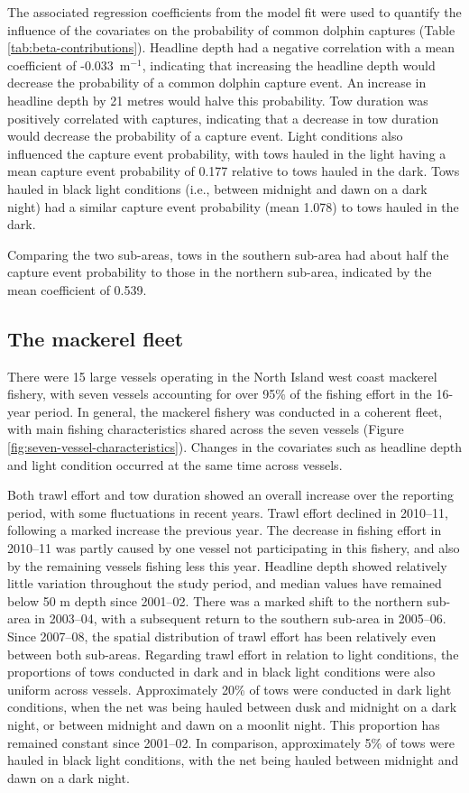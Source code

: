\documentclass[10pt]{article}
\begin{document}
The associated regression coefficients from the model fit were used to quantify the influence of the covariates on the probability of common dolphin captures (Table \ref{tab:beta-contributions}). 
Headline depth had a negative correlation with a mean coefficient of
-0.033~m$^{-1}$, indicating that increasing the headline depth would
decrease the probability of a common dolphin capture event.  An
increase in headline depth by 21 metres would halve this probability.
Tow duration was positively correlated with captures, indicating
that a decrease in tow duration would decrease the probability of a capture event.  Light conditions also influenced the capture event probability, with tows hauled in the light having a mean capture event probability of 0.177 relative to tows hauled in the dark. Tows hauled in black light conditions (i.e., between midnight and dawn on a dark night) had a similar capture event probability (mean 1.078) to tows hauled in the dark.  

Comparing the two sub-areas, tows in the southern sub-area had about half the capture event probability to those in the northern sub-area, indicated by the mean coefficient of 0.539.

\subsection*{The mackerel fleet}

There were 15 large vessels operating in the North Island west coast mackerel fishery, with seven vessels accounting for over 95\% of the fishing effort in the 16-year period.
In general, the mackerel fishery was conducted in a coherent fleet,  with main fishing characteristics shared across the seven vessels (Figure \ref{fig:seven-vessel-characteristics}).  Changes in the covariates such as headline depth and light condition occurred at the same time across vessels.

Both trawl effort and tow duration showed an overall increase over the reporting period, with some fluctuations in recent years.  Trawl effort declined in \mbox{2010--11}, following a marked increase the previous year.  The decrease in fishing effort in \mbox{2010--11} was partly caused by one vessel not participating in this fishery, and also by the remaining vessels fishing less this year. Headline depth showed relatively little variation throughout the study period, and median values have remained below 50 m depth since \mbox{2001--02}.   There was a marked 
shift to the northern sub-area in \mbox{2003--04}, with a subsequent return to the southern sub-area in \mbox{2005--06}. Since \mbox{2007--08}, the spatial distribution of trawl effort has been relatively even between both sub-areas. Regarding trawl effort in relation to light conditions, the proportions of tows conducted in dark and in black light conditions were also uniform across vessels.  Approximately 20\% of tows were conducted in dark light conditions, when the net was being hauled between dusk and midnight on a dark night, or between midnight and dawn on a moonlit night.  This proportion has remained constant since \mbox{2001--02}.  In comparison, approximately 5\% of tows were hauled in black light conditions, with the net being hauled between midnight and dawn on a dark night. 
\end{document}
